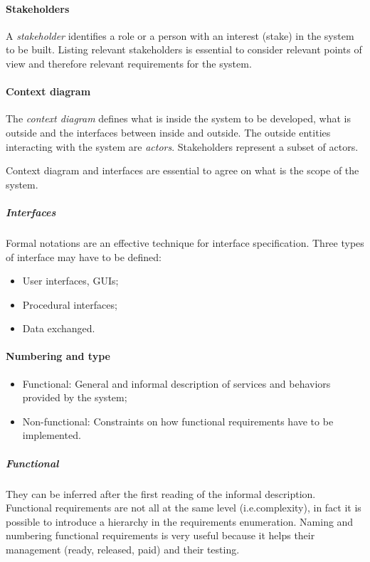 \paragraph{Stakeholders}
A \emph{stakeholder} identifies a role or a person with an interest (stake) in the system to be built. Listing relevant stakeholders is essential to consider relevant points of view and therefore relevant requirements for the system.

\paragraph{Context diagram}
The \emph{context diagram} defines what is inside the system to be developed, what is outside and the interfaces between inside and outside. The outside entities interacting with the system are \textit{actors}. Stakeholders represent a subset of actors.

Context diagram and interfaces are essential to agree on what is the scope of the system.

\subparagraph{Interfaces}
Formal notations are an effective technique for interface specification.
Three types of interface may have to be defined:
\begin{itemize}
\item User interfaces, GUIs;
\item Procedural interfaces;
\item Data exchanged.
\end{itemize}

\paragraph{Numbering and type}
\begin{itemize}
\item Functional: General and informal description of services and behaviors provided by the system;
\item Non-functional: Constraints on how functional requirements have to be implemented.
\end{itemize}

\subparagraph{Functional}
They can be inferred after the first reading of the informal description. Functional requirements are not all at the same level (i.e.\@ complexity), in fact it is possible to introduce a hierarchy in the requirements enumeration. Naming and numbering functional requirements is very useful because it helps their management (ready, released, paid) and their testing.

